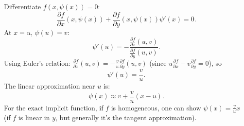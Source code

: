\documentclass[12pt]{article}
\begin{document}
\begin{answerbox}
\begin{enumerate}
    Differentiate \( f(x,\psi(x))=0 \):
    \[
    \frac{\partial f}{\partial x}(x,\psi(x)) + \frac{\partial f}{\partial y}(x,\psi(x)) \psi'(x) = 0.
    \]
    At \( x=u \), \( \psi(u)=v \):
    \[
    \psi'(u) = -\frac{\frac{\partial f}{\partial x}(u,v)}{\frac{\partial f}{\partial y}(u,v)}.
    \]
    Using Euler's relation: \( \frac{\partial f}{\partial x}(u,v) = -\frac{v}{u} \frac{\partial f}{\partial y}(u,v) \) (since \( u\frac{\partial f}{\partial x}+v\frac{\partial f}{\partial y}=0 \)), so
    \[
    \psi'(u) = \frac{v}{u}.
    \]
    The linear approximation near \( u \) is:
    \[
    \psi(x) \approx v + \frac{v}{u}(x-u).
    \]
    For the exact implicit function, if \( f \) is homogeneous, one can show \( \psi(x) = \frac{v}{u}x \) (if \( f \) is linear in \( y \), but generally it's the tangent approximation).
\end{enumerate}
\end{answerbox}

\end{document}
